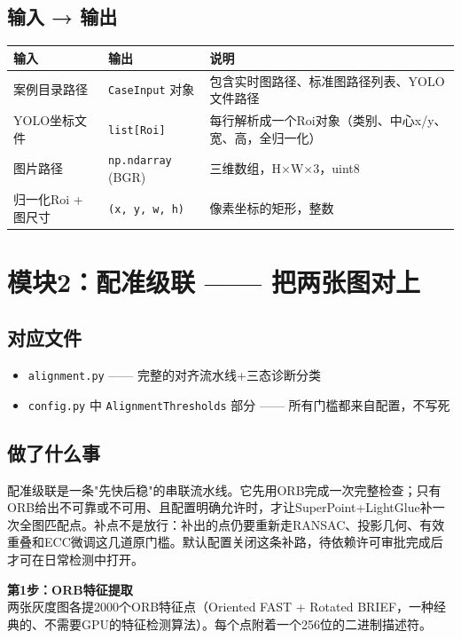 \documentclass[12pt,a4paper]{ctexart}
\begin{document}
\subsection*{输入 → 输出}

\noindent\begin{tabular}{|p{4cm}|p{4cm}|p{5cm}|}
\hline
\textbf{输入} & \textbf{输出} & \textbf{说明} \\
\hline
案例目录路径 & \texttt{CaseInput} 对象 & 包含实时图路径、标准图路径列表、YOLO文件路径 \\
\hline
YOLO坐标文件 & \texttt{list[Roi]} & 每行解析成一个Roi对象（类别、中心x/y、宽、高，全归一化） \\
\hline
图片路径 & \texttt{np.ndarray} (BGR) & 三维数组，H×W×3，uint8 \\
\hline
归一化Roi + 图尺寸 & \texttt{(x, y, w, h)} & 像素坐标的矩形，整数 \\
\hline
\end{tabular}


\section{模块2：配准级联 —— 把两张图对上}

\subsection*{对应文件}
\begin{itemize}
\item \texttt{alignment.py} —— 完整的对齐流水线+三态诊断分类
\item \texttt{config.py} 中 \texttt{AlignmentThresholds} 部分 —— 所有门槛都来自配置，不写死
\end{itemize}

\subsection*{做了什么事}

配准级联是一条"先快后稳"的串联流水线。它先用ORB完成一次完整检查；只有ORB给出不可靠或不可用、且配置明确允许时，才让SuperPoint+LightGlue补一次全图匹配点。补点不是放行：补出的点仍要重新走RANSAC、投影几何、有效重叠和ECC微调这几道原门槛。默认配置关闭这条补路，待依赖许可审批完成后才可在日常检测中打开。

\textbf{第1步：ORB特征提取}\\[2pt]
两张灰度图各提2000个ORB特征点（Oriented FAST + Rotated BRIEF，一种经典的、不需要GPU的特征检测算法）。每个点附着一个256位的二进制描述符。
\end{document}
